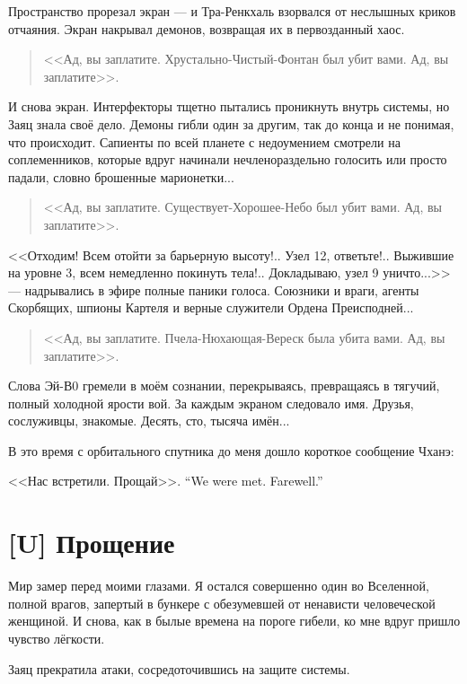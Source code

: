 Пространство прорезал экран --- и Тра-Ренкхаль взорвался от неслышных криков отчаяния.
Экран накрывал демонов, возвращая их в первозданный хаос.

\begin{quote}
<<Ад, вы заплатите.
Хрустально-Чистый-Фонтан был убит вами.
Ад, вы заплатите>>.
\end{quote}

И снова экран.
Интерфекторы тщетно пытались проникнуть внутрь системы, но Заяц знала своё дело.
Демоны гибли один за другим, так до конца и не понимая, что происходит.
Сапиенты по всей планете с недоумением смотрели на соплеменников, которые вдруг начинали нечленораздельно голосить или просто падали, словно брошенные марионетки...

\begin{quote}
<<Ад, вы заплатите.
Существует-Хорошее-Небо был убит вами.
Ад, вы заплатите>>.
\end{quote}

<<Отходим!
Всем отойти за барьерную высоту!..
Узел 12, ответьте!..
Выжившие на уровне 3, всем немедленно покинуть тела!..
Докладываю, узел 9 уничто...>> --- надрывались в эфире полные паники голоса.
Союзники и враги, агенты Скорбящих, шпионы Картеля и верные служители Ордена Преисподней...

\begin{quote}
<<Ад, вы заплатите.
Пчела-Нюхающая-Вереск была убита вами.
Ад, вы заплатите>>.
\end{quote}

Слова Эй-В0 гремели в моём сознании, перекрываясь, превращаясь в тягучий, полный холодной ярости вой.
За каждым экраном следовало имя.
Друзья, сослуживцы, знакомые.
Десять, сто, тысяча имён...

В это время с орбитального спутника до меня дошло короткое сообщение Чханэ:

{<<Нас встретили. Прощай>>.}
{``We were met. Farewell.''}

\section{[U] Прощение}

Мир замер перед моими глазами.
Я остался совершенно один во Вселенной, полной врагов, запертый в бункере с обезумевшей от ненависти человеческой женщиной.
И снова, как в былые времена на пороге гибели, ко мне вдруг пришло чувство лёгкости.

Заяц прекратила атаки, сосредоточившись на защите системы.


